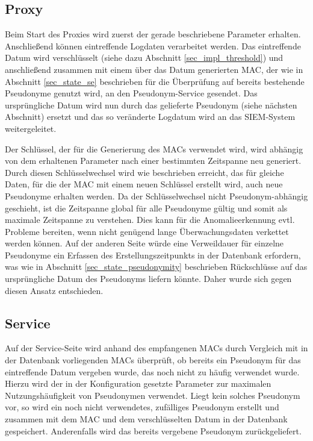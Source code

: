 \subsection{Proxy}

Beim Start des Proxies wird zuerst der gerade beschriebene Parameter erhalten. Anschließend können eintreffende Logdaten verarbeitet werden. Das eintreffende Datum wird verschlüsselt (siehe dazu Abschnitt \ref{sec_impl_threshold}) und anschließend zusammen mit einem über das Datum generierten MAC, der wie in Abschnitt \ref{sec_state_se} beschrieben für die Überprüfung auf bereits bestehende Pseudonyme genutzt wird, an den Pseudonym-Service gesendet. Das ursprüngliche Datum wird nun durch das gelieferte Pseudonym (siehe nächsten Abschnitt) ersetzt und das so veränderte Logdatum wird an das SIEM-System weitergeleitet.

Der Schlüssel, der für die Generierung des MACs verwendet wird, wird abhängig von dem erhaltenen Parameter nach einer bestimmten Zeitspanne neu generiert. Durch diesen Schlüsselwechsel wird wie beschrieben erreicht, das für gleiche Daten, für die der MAC mit einem neuen Schlüssel erstellt wird, auch neue Pseudonyme erhalten werden. 
Da der Schlüsselwechsel nicht Pseudonym-abhängig geschieht, ist die Zeitspanne global für alle Pseudonyme gültig und somit als maximale Zeitspanne zu verstehen. Dies kann für die Anomalieerkennung evtl. Probleme bereiten, wenn nicht genügend lange Überwachungsdaten verkettet werden können. Auf der anderen Seite würde eine Verweildauer für einzelne Pseudonyme ein Erfassen des Erstellungszeitpunkts in der Datenbank erfordern, was wie in Abschnitt \ref{sec_state_pseudonymity} beschrieben Rückschlüsse auf das ursprüngliche Datum des Pseudonyms liefern könnte. Daher wurde sich gegen diesen Ansatz entschieden.

\subsection{Service}

Auf der Service-Seite wird anhand des empfangenen MACs durch Vergleich mit in der Datenbank vorliegenden MACs überprüft, ob bereits ein Pseudonym für das eintreffende Datum vergeben wurde, das noch nicht zu häufig verwendet wurde. Hierzu wird der in der Konfiguration gesetzte Parameter zur maximalen Nutzungshäufigkeit von Pseudonymen verwendet. Liegt kein solches Pseudonym vor, so wird ein noch nicht verwendetes, zufälliges Pseudonym erstellt und zusammen mit dem MAC und dem verschlüsselten Datum in der Datenbank gespeichert. Anderenfalls wird das bereits vergebene Pseudonym zurückgeliefert. 

